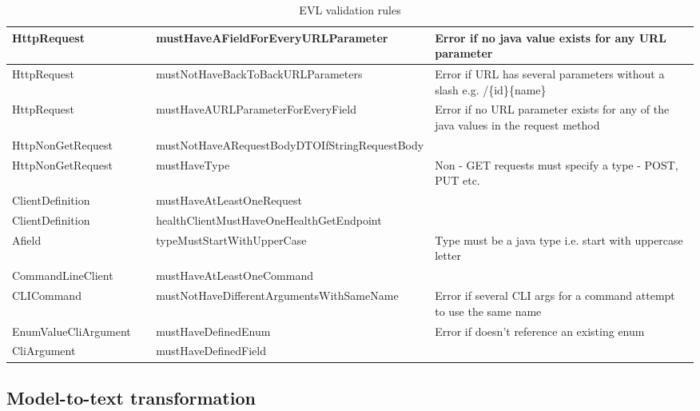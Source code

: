 \documentclass[parskip=full]{article}
\begin{document}
\begin{table}[h]
\begin{tabular}{|p{0.21\linewidth}|p{0.4\linewidth}|p{0.39\linewidth}|}
            \hline
            HttpRequest & mustHaveAFieldForEveryURLParameter & Error if no java value exists for any URL parameter \\
            \hline
            HttpRequest & mustNotHaveBackToBackURLParameters & Error if URL has several parameters without a slash e.g. /\{id\}\{name\} \\
            \hline
            HttpRequest & mustHaveAURLParameterForEveryField & Error if no URL parameter exists for any of the java values in the request method \\
            \hline
            HttpNonGetRequest &\hspace{0pt}mustNotHaveARequestBodyDTOIfStringRequestBody &  \\
            \hline
            HttpNonGetRequest & mustHaveType & Non - GET requests must specify a type - POST, PUT etc. \\
            \hline
            ClientDefinition & mustHaveAtLeastOneRequest &  \\
            \hline
            ClientDefinition & healthClientMustHaveOneHealthGetEndpoint &  \\
            \hline
            Afield & typeMustStartWithUpperCase & Type must be a java type i.e. start with uppercase letter \\
            \hline
            CommandLineClient & mustHaveAtLeastOneCommand &  \\
            \hline
            CLICommand &\hspace{0pt}mustNotHaveDifferentArgumentsWithSameName & Error if several CLI args for a command attempt to use the same name \\
            \hline
            EnumValueCliArgument & mustHaveDefinedEnum & Error if doesn't reference an existing enum \\
            \hline
            CliArgument & mustHaveDefinedField &  \\
            \bottomrule
        \end{tabular}
        \caption{EVL validation rules}
        \label{tab:evlTable}
    \end{table}

    \pagebreak
    \subsection{Model-to-text transformation}
\end{document}
